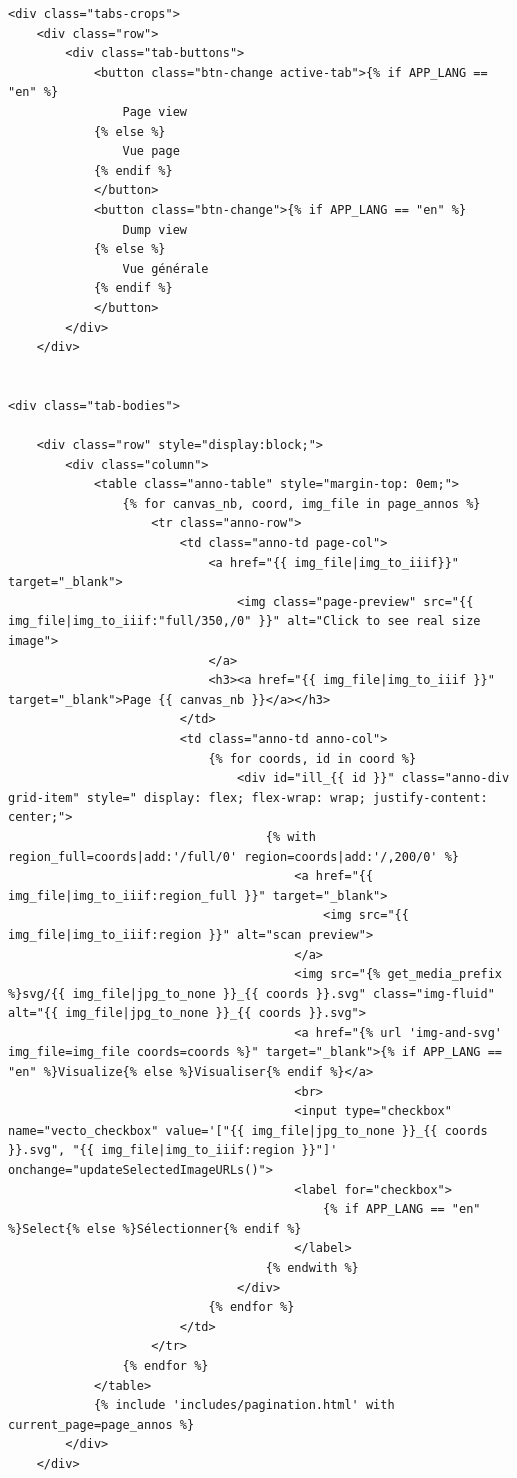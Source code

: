 \begin{lstlisting}[language=HTML5, frame=single, breaklines=true, caption={Template \html pour afficher les extractions et leurs vectorisations.}]
<div class="tabs-crops">
    <div class="row">
        <div class="tab-buttons">
            <button class="btn-change active-tab">{% if APP_LANG == "en" %}
                Page view
            {% else %}
                Vue page
            {% endif %}
            </button>
            <button class="btn-change">{% if APP_LANG == "en" %}
                Dump view
            {% else %}
                Vue générale
            {% endif %}
            </button>
        </div>
    </div>


<div class="tab-bodies">

    <div class="row" style="display:block;">
        <div class="column">
            <table class="anno-table" style="margin-top: 0em;">
                {% for canvas_nb, coord, img_file in page_annos %}
                    <tr class="anno-row">
                        <td class="anno-td page-col">
                            <a href="{{ img_file|img_to_iiif}}" target="_blank">
                                <img class="page-preview" src="{{ img_file|img_to_iiif:"full/350,/0" }}" alt="Click to see real size image">
                            </a>
                            <h3><a href="{{ img_file|img_to_iiif }}" target="_blank">Page {{ canvas_nb }}</a></h3>
                        </td>
                        <td class="anno-td anno-col">
                            {% for coords, id in coord %}
                                <div id="ill_{{ id }}" class="anno-div grid-item" style=" display: flex; flex-wrap: wrap; justify-content: center;">
                                    {% with region_full=coords|add:'/full/0' region=coords|add:'/,200/0' %}
                                        <a href="{{ img_file|img_to_iiif:region_full }}" target="_blank">
                                            <img src="{{ img_file|img_to_iiif:region }}" alt="scan preview">
                                        </a>
                                        <img src="{% get_media_prefix %}svg/{{ img_file|jpg_to_none }}_{{ coords }}.svg" class="img-fluid" alt="{{ img_file|jpg_to_none }}_{{ coords }}.svg">
                                        <a href="{% url 'img-and-svg' img_file=img_file coords=coords %}" target="_blank">{% if APP_LANG == "en" %}Visualize{% else %}Visualiser{% endif %}</a>
                                        <br>
                                        <input type="checkbox" name="vecto_checkbox" value='["{{ img_file|jpg_to_none }}_{{ coords }}.svg", "{{ img_file|img_to_iiif:region }}"]' onchange="updateSelectedImageURLs()">
                                        <label for="checkbox">
                                            {% if APP_LANG == "en" %}Select{% else %}Sélectionner{% endif %}
                                        </label>
                                    {% endwith %}
                                </div>
                            {% endfor %}
                        </td>
                    </tr>
                {% endfor %}
            </table>
            {% include 'includes/pagination.html' with current_page=page_annos %}
        </div>
    </div>


\end{lstlisting}
